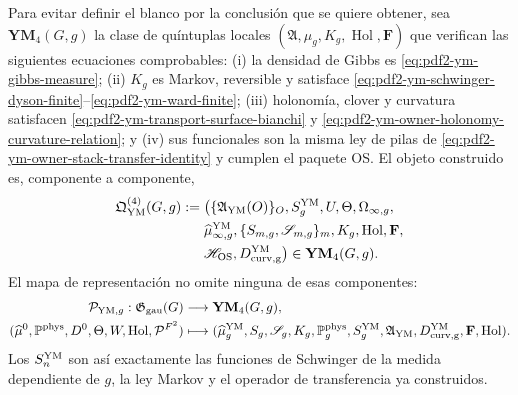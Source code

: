 Para evitar definir el blanco por la conclusión que se quiere obtener, sea
$\mathbf{YM}_4(G,g)$ la clase de quíntuplas locales
$(\mathfrak A,\mu_g,K_g,\operatorname{Hol},\mathbf F)$ que verifican las siguientes
ecuaciones comprobables: (i) la densidad de Gibbs es
\eqref{eq:pdf2-ym-gibbs-measure}; (ii) $K_g$ es Markov, reversible y satisface
\eqref{eq:pdf2-ym-schwinger-dyson-finite}--\eqref{eq:pdf2-ym-ward-finite};
(iii) holonomía, clover y curvatura satisfacen
\eqref{eq:pdf2-ym-transport-surface-bianchi} y
\eqref{eq:pdf2-ym-owner-holonomy-curvature-relation}; y (iv) sus funcionales son la
misma ley de pilas de \eqref{eq:pdf2-ym-owner-stack-transfer-identity} y cumplen el
paquete OS\@. El objeto construido es, componente a componente,
\begin{equation}\label{eq:pdf2-ym-owner-qym-object}
\begin{aligned}
 \mathfrak Q_{\rm YM}^{(4)}(G,g):={}&
 \bigl(\{\mathfrak A_{\rm YM}(O)\}_O,
 S_g^{\rm YM},U,\Theta,\Omega_{\infty,g},\\
 &\widehat\mu_{\infty,g}^{\rm YM},
 \{S_{m,g},\mathscr S_{m,g}\}_m,K_g,
 \operatorname{Hol},\mathbf F,\\
 &\mathscr H_{\rm OS},D_{\rm curv,g}^{\rm YM}\bigr)
 \in\mathbf{YM}_4(G,g).
\end{aligned}
\end{equation}
El mapa de representación no omite ninguna de esas componentes:
\begin{equation}\label{eq:pdf2-ym-owner-typed-publication-map}
 \begin{aligned}
 \mathcal P_{{\rm YM},g}:\mathfrak G_{\rm gau}(G)&\longrightarrow
 \mathbf{YM}_4(G,g),\\
 (\widehat\mu^0,\mathbb P^{\rm phys},D^0,\Theta,W,
   \operatorname{Hol},\mathcal P^{F^2})
 &\longmapsto
 (\widehat\mu_g^{\rm YM},S_g,\mathscr S_g,K_g,\mathbb P_g^{\rm phys},
  S_g^{\rm YM},\mathfrak A_{\rm YM},D_{\rm curv,g}^{\rm YM},
  \mathbf F,\operatorname{Hol}).
 \end{aligned}
\end{equation}
Los $S_n^{\rm YM}$ son así exactamente las funciones de Schwinger de la medida
dependiente de $g$, la ley Markov y el operador de transferencia ya construidos.

